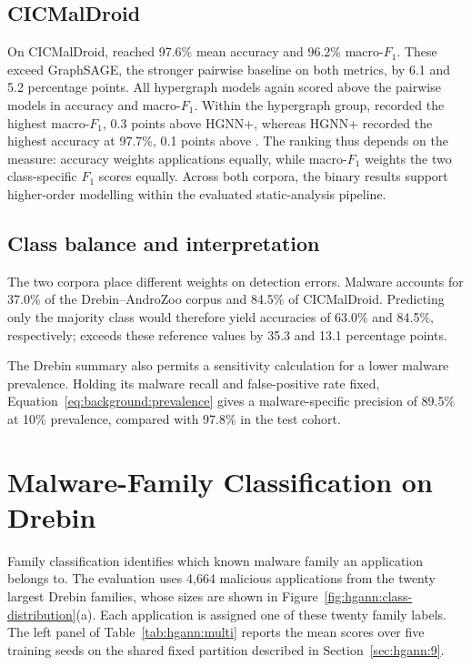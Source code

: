 \subsection*{CICMalDroid}

On CICMalDroid, \hgann{} reached 97.6\% mean accuracy and 96.2\% macro-$F_1$.
These exceed GraphSAGE, the stronger pairwise baseline on both metrics, by 6.1 and
5.2 percentage points. All hypergraph models again scored above the pairwise models in
accuracy and macro-$F_1$. Within the hypergraph group, \hgann{} recorded the highest
macro-$F_1$, 0.3 points above HGNN+, whereas HGNN+ recorded the highest accuracy at
97.7\%, 0.1 points above \hgann{}. The ranking thus depends on the measure: accuracy
weights applications equally, while macro-$F_1$ weights the two class-specific $F_1$ scores
equally. Across both corpora, the binary results support higher-order modelling within the
evaluated static-analysis pipeline.

\subsection*{Class balance and interpretation}

The two corpora place different weights on detection errors. Malware accounts for 37.0\% of the Drebin--AndroZoo corpus and 84.5\% of
CICMalDroid. Predicting only the
majority class would therefore yield accuracies of 63.0\% and 84.5\%, respectively;
\hgann{} exceeds these reference values by 35.3 and 13.1 percentage points.

The Drebin summary also permits a sensitivity calculation for a lower malware prevalence.
Holding its malware recall and false-positive rate fixed, Equation~\ref{eq:background:prevalence}
gives a malware-specific precision of 89.5\% at 10\% prevalence, compared with
97.8\% in the test cohort.

\section{Malware-Family Classification on Drebin}
\label{sec:hgann:11}

Family classification identifies which known malware family an application belongs to.
The evaluation uses 4,664 malicious applications from the twenty largest Drebin families,
whose sizes are shown in Figure~\ref{fig:hgann:class-distribution}(a). Each application is
assigned one of these twenty family labels. The left panel of Table~\ref{tab:hgann:multi}
reports the mean scores over five training seeds on the shared fixed partition described in
Section~\ref{sec:hgann:9}.

